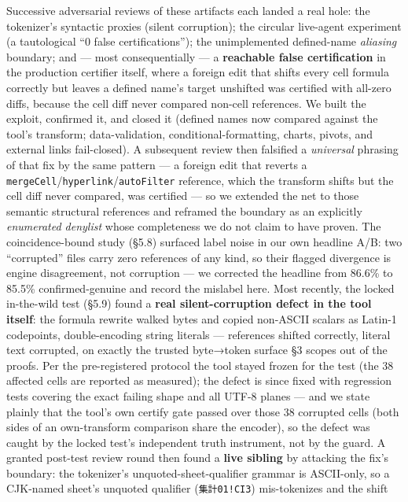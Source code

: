 \documentclass[
  11pt,
]{article}
\begin{document}
Successive adversarial reviews of these artifacts each landed a real
hole: the tokenizer's syntactic proxies (silent corruption); the
circular live-agent experiment (a tautological ``0 false
certifications''); the unimplemented defined-name \emph{aliasing}
boundary; and --- most consequentially --- a \textbf{reachable false
certification} in the production certifier itself, where a foreign edit
that shifts every cell formula correctly but leaves a defined name's
target unshifted was certified with all-zero diffs, because the cell
diff never compared non-cell references. We built the exploit, confirmed
it, and closed it (defined names now compared against the tool's
transform; data-validation, conditional-formatting, charts, pivots, and
external links fail-closed). A subsequent review then falsified a
\emph{universal} phrasing of that fix by the same pattern --- a foreign
edit that reverts a
\texttt{mergeCell}/\texttt{hyperlink}/\texttt{autoFilter} reference,
which the transform shifts but the cell diff never compared, was
certified --- so we extended the net to those semantic structural
references and reframed the boundary as an explicitly \emph{enumerated
denylist} whose completeness we do not claim to have proven. The
coincidence-bound study (§5.8) surfaced label noise in our own headline
A/B: two ``corrupted'' files carry zero references of any kind, so their
flagged divergence is engine disagreement, not corruption --- we
corrected the headline from 86.6\% to 85.5\% confirmed-genuine and
record the mislabel here. Most recently, the locked in-the-wild test
(§5.9) found a \textbf{real silent-corruption defect in the tool
itself}: the formula rewrite walked bytes and copied non-ASCII scalars
as Latin-1 codepoints, double-encoding string literals --- references
shifted correctly, literal text corrupted, on exactly the trusted
byte→token surface §3 scopes out of the proofs. Per the pre-registered
protocol the tool stayed frozen for the test (the 38 affected cells are
reported as measured); the defect is since fixed with regression tests
covering the exact failing shape and all UTF-8 planes --- and we state
plainly that the tool's own certify gate passed over those 38 corrupted
cells (both sides of an own-transform comparison share the encoder), so
the defect was caught by the locked test's independent truth instrument,
not by the guard. A granted post-test review round then found a
\textbf{live sibling} by attacking the fix's boundary: the tokenizer's
unquoted-sheet-qualifier grammar is ASCII-only, so a CJK-named sheet's
unquoted qualifier (\texttt{\cjkfont 集計01!CI3}) mis-tokenizes and the shift
\end{document}
